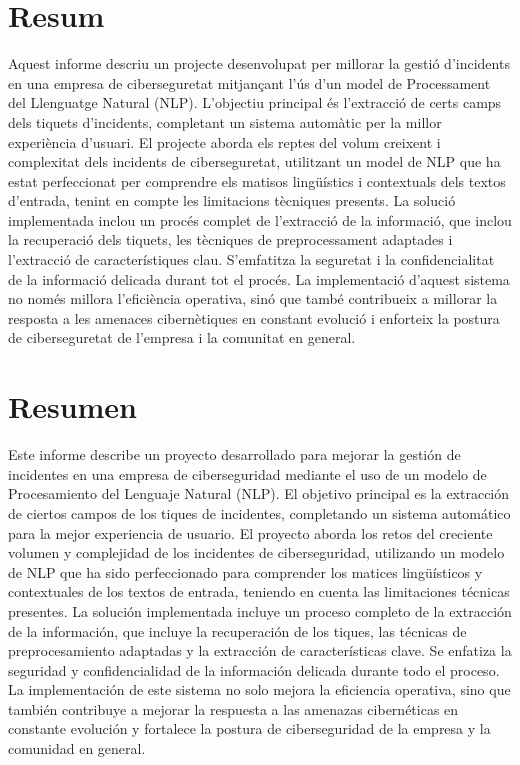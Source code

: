 \chapter*{\centering Resum}
Aquest informe descriu un projecte desenvolupat per millorar la gestió d'incidents en una empresa de ciberseguretat mitjançant l'ús d'un model de Processament del Llenguatge Natural (NLP). L'objectiu principal és l'extracció de certs camps dels tiquets d'incidents, completant un sistema automàtic per la millor experiència d'usuari. El projecte aborda els reptes del volum creixent i complexitat dels incidents de ciberseguretat, utilitzant un model de NLP que ha estat perfeccionat per comprendre els matisos lingüístics i contextuals dels textos d'entrada, tenint en compte les limitacions tècniques presents. La solució implementada inclou un procés complet de l'extracció de la informació, que inclou la recuperació dels tiquets, les tècniques de preprocessament adaptades i l'extracció de característiques clau. S'emfatitza la seguretat i la confidencialitat de la informació delicada durant tot el procés. La implementació d'aquest sistema no només millora l'eficiència operativa, sinó que també contribueix a millorar la resposta a les amenaces cibernètiques en constant evolució i enforteix la postura de ciberseguretat de l'empresa i la comunitat en general.

\chapter*{\centering Resumen}
Este informe describe un proyecto desarrollado para mejorar la gestión de incidentes en una empresa de ciberseguridad mediante el uso de un modelo de Procesamiento del Lenguaje Natural (NLP). El objetivo principal es la extracción de ciertos campos de los tiques de incidentes, completando un sistema automático para la mejor experiencia de usuario. El proyecto aborda los retos del creciente volumen y complejidad de los incidentes de ciberseguridad, utilizando un modelo de NLP que ha sido perfeccionado para comprender los matices lingüísticos y contextuales de los textos de entrada, teniendo en cuenta las limitaciones técnicas presentes. La solución implementada incluye un proceso completo de la extracción de la información, que incluye la recuperación de los tiques, las técnicas de preprocesamiento adaptadas y la extracción de características clave. Se enfatiza la seguridad y confidencialidad de la información delicada durante todo el proceso. La implementación de este sistema no solo mejora la eficiencia operativa, sino que también contribuye a mejorar la respuesta a las amenazas cibernéticas en constante evolución y fortalece la postura de ciberseguridad de la empresa y la comunidad en general.


